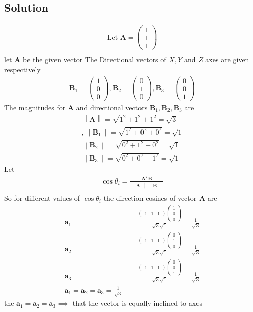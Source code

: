 \documentclass[12pt]{article}
\newcommand{\mydet}[1]{\ensuremath{\begin{vmatrix}#1\end{vmatrix}}}
\providecommand{\norm}[1]{\left\lVert#1\right\rVert}
\newcommand{\myvec}[1]{\ensuremath{\begin{pmatrix}#1\end{pmatrix}}}
\let\vec\mathbf
\begin{document}
\begin{enumerate}
\section{Solution}
\begin{align}
\text{Let } \vec{A} = \myvec{1\\1\\1}\\  
\end{align}
let $\vec{A}$ be the given vector
The Directional vectors of $X,Y$ and $Z$ axes are given respectively 
\begin{align}
		\vec{B}_1 =\myvec{1\\0\\0},\vec{B}_2=\myvec{0\\1\\0},\vec{B}_3 =\myvec{0\\0\\1}
\end{align}
		The magnitudes for $\vec{A}$ and directional vectors $\vec{B}_1,\vec{B}_2,\vec{B}_3$ are
	\begin{align}
\norm{\vec{A}} =\sqrt{1^2+1^2+1^2}=\sqrt{3}\\,\norm{\vec{B}_1}=\sqrt{1^2+0^2+0^2}=\sqrt{1}\\ \norm{\vec{B}_2}=\sqrt{0^2+1^2+0^2}=\sqrt{1}\\
\norm{\vec{B}_3}=\sqrt{0^2+0^2+1^2}=\sqrt{1}
	\end{align}
Let 
\begin{align}
	\cos\theta_i=\frac{\vec{A}^{T}\vec{B}}{\mydet{\vec{A}}\mydet{\vec{B}}}\\  
\end{align}
		So for different values of $\cos\theta_i$ the direction cosines of vector $\vec{A}$ are
\begin{align}
	\vec{a}_1 &=\frac{\myvec{1&1&1}\myvec{1\\0\\0}}{\sqrt{3}\sqrt{1}}=\frac{1}{\sqrt{3}}\\
	\vec{a}_2 &=\frac{\myvec{1&1&1}\myvec{0\\1\\0}}{\sqrt{3}\sqrt{1}}=\frac{1}{\sqrt{3}}\\
	\vec{a}_3 &=\frac{\myvec{1&1&1}\myvec{0\\0\\1}}{\sqrt{3}\sqrt{1}}=\frac{1}{\sqrt{3}}\\
	\vec{a}_1=\vec{a}_2=\vec{a}_3 =\frac{1}{\sqrt{3}}
\end{align}
 the $\vec{a}_1=\vec{a}_2=\vec{a}_3 \implies$  that the vector is equally inclined to axes
\end{enumerate}
\end{document}

